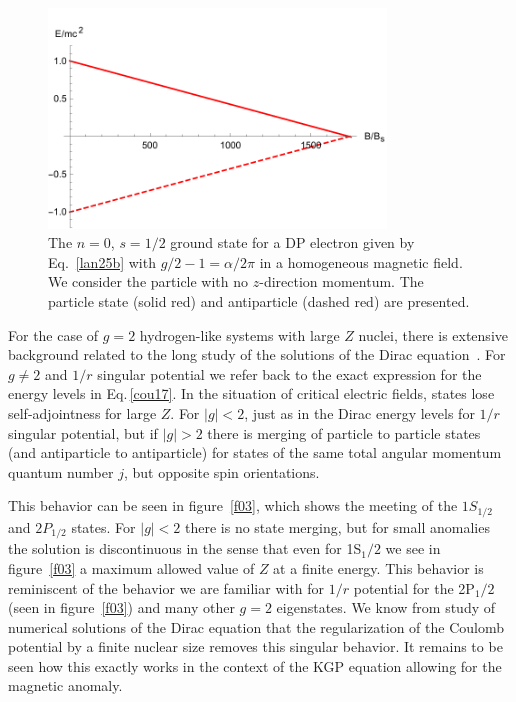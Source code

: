 \begin{figure}
 \centering
 \includegraphics[clip, trim=0.0cm 0.0cm 0.0cm 0.5cm,width=0.8\textwidth]{plots/chap02moment/lanplot02.pdf}
 \caption[]{The $n=0$, $s=1/2$ ground state for a DP electron given by Eq.~\eqref{lan25b} with $g/2-1=\alpha/2\pi$ in a homogeneous magnetic field. We consider the particle with no $z$-direction momentum. The particle state (solid red) and antiparticle (dashed red) are presented.}
 \label{f02}
\end{figure}

For the case of $g=2$ hydrogen-like systems with large $Z$ nuclei, there is extensive background related to the long study of the solutions of the Dirac equation~\citep{Rafelski:1976ts,Greiner:1985ce,Rafelski:2016ixr}. For $g\ne 2$ and $1/r$ singular potential we refer back to the exact expression for the energy levels in Eq.\,\eqref{cou17}. In the situation of critical electric fields, states lose self-adjointness for large $Z$. For $|g|<2$, just as in the Dirac energy levels for $1/r$ singular potential, but if $|g|>2$ there is merging of particle to particle states (and antiparticle to antiparticle) for states of the same total angular momentum quantum number $j$, but opposite spin orientations.

This behavior can be seen in figure~\ref{f03}, which shows the meeting of the $1S_{1/2}$ and $2P_{1/2}$ states. For $|g|<2$ there is no state merging, but for small anomalies the solution is discontinuous in the sense that even for 1S$_1/2$ we see in figure~\ref{f03} a maximum allowed value of $Z$ at a finite energy. This behavior is reminiscent of the behavior we are familiar with for $1/r$ potential for the 2P$_1/2$ (seen in figure~\ref{f03}) and many other $g=2$ eigenstates. We know from study of numerical solutions of the Dirac equation that the regularization of the Coulomb potential by a finite nuclear size removes this singular behavior. It remains to be seen how this exactly works in the context of the KGP equation allowing for the magnetic anomaly.

